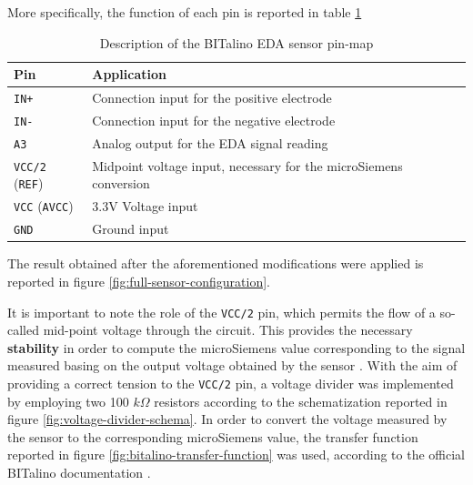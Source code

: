 More specifically, the function of each pin is reported in table \ref{toc:bitalino-pinmap-table}

\begin{table}[H]
\centering
\begin{tabular}{ll}
    \hline
    \textbf{Pin}                    & \textbf{Application} \\
    \hline
    \texttt{IN+}                    & Connection input for the positive electrode \\
    \texttt{IN-}                    & Connection input for the negative electrode \\
    \texttt{A3}                     & Analog output for the EDA signal reading \\
    \texttt{VCC/2} (\texttt{REF})   & Midpoint voltage input, necessary for the microSiemens conversion \\
    \texttt{VCC} (\texttt{AVCC})    & 3.3V Voltage input \\
    \texttt{GND}                    & Ground input \\
    \hline
\end{tabular}
\caption{Description of the BITalino EDA sensor pin-map}
\label{toc:bitalino-pinmap-table}
\end{table}

\vspace{1cm}

The result obtained after the aforementioned modifications were applied is reported in figure \ref{fig:full-sensor-configuration}. 

It is important to note the role of the \texttt{VCC/2} pin, which permits the flow of a so-called mid-point voltage through the circuit. This provides the necessary \textbf{stability} in order to compute the microSiemens value corresponding to the signal measured basing on the output voltage obtained by the sensor \cite{bitalino-midpoint-voltage}. With the aim of providing a correct tension to the \texttt{VCC/2} pin, a voltage divider was implemented by employing two 100 $k\Omega$ resistors according to the schematization reported in figure \ref{fig:voltage-divider-schema}. In order to convert the voltage measured by the sensor to the corresponding microSiemens value, the transfer function reported in figure \ref{fig:bitalino-transfer-function} was used, according to the official BITalino documentation \cite{bitalino-general}.

